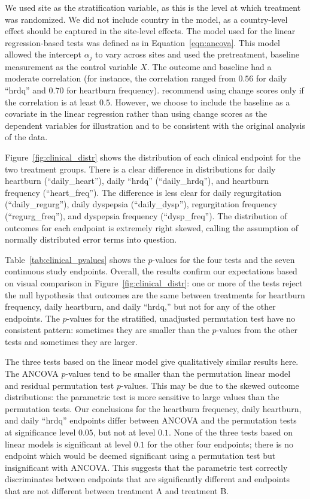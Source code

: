 \documentclass[12pt]{article}
\newcommand{\todo}[1]{{\color{red}{TO DO: \sc #1}}}
\begin{document}
We used site as the stratification variable, as this is the level at which treatment was randomized.
We did not include country in the model, as a country-level effect should be captured in the site-level effects.
The model used for the linear regression-based tests was defined as in Equation~\ref{eqn:ancova}.
This model allowed the intercept $\alpha_j$ to vary across sites and used the pretreatment, baseline measurement as the control variable $X$.
The outcome and baseline had a moderate correlation (for instance, the correlation ranged from $0.56$ for daily ``hrdq'' and $0.70$ for heartburn frequency).
\cite{frison_repeated_1992} recommend using change scores only if the correlation is at least $0.5$.
However, we choose to include the baseline as a covariate in the linear regression rather than using change scores as the dependent variables for illustration and to be consistent with the original analysis of the data.

Figure~\ref{fig:clinical_distr} shows the distribution of each clinical endpoint for the two treatment groups.
There is a clear difference in distributions for daily heartburn (``daily\_heart''), daily ``hrdq'' (``daily\_hrdq''), and heartburn frequency (``heart\_freq'').
The difference is less clear for daily regurgitation (``daily\_regurg''), daily dyspepsia (``daily\_dysp''), regurgitation frequency (``regurg\_freq''), and dyspepsia frequency (``dysp\_freq'').
The distribution of outcomes for each endpoint is extremely right skewed, calling the assumption of normally distributed error terms into question.
\todo{discuss other assumptions}

Table~\ref{tab:clinical_pvalues} shows the $p$-values for the four tests and the seven continuous study endpoints.
Overall, the results confirm our expectations based on visual comparison in Figure~\ref{fig:clinical_distr}:
one or more of the tests reject the null hypothesis that outcomes are the same between treatments for heartburn frequency, daily heartburn, and daily ``hrdq,''
but not for any of the other endpoints.
The $p$-values for the stratified, unadjusted permutation test have no consistent pattern: sometimes they are smaller than the $p$-values from the other tests and sometimes they are larger.

The three tests based on the linear model give qualitatively similar results here.
The ANCOVA $p$-values tend to be smaller than the permutation linear model and residual permutation test $p$-values.
This may be due to the skewed outcome distributions: the parametric test is more sensitive to large values than the permutation tests.
Our conclusions for the heartburn frequency, daily heartburn, and daily ``hrdq'' endpoints differ between ANCOVA and the permutation tests at significance level $0.05$, but not at level $0.1$.
None of the three tests based on linear models is significant at level $0.1$ for the other four endpoints;
there is no endpoint which would be deemed significant using a permutation test but insignificant with ANCOVA.
This suggests that the parametric test correctly discriminates between endpoints that are significantly different and endpoints that are not different between treatment A and treatment B.
\end{document}

